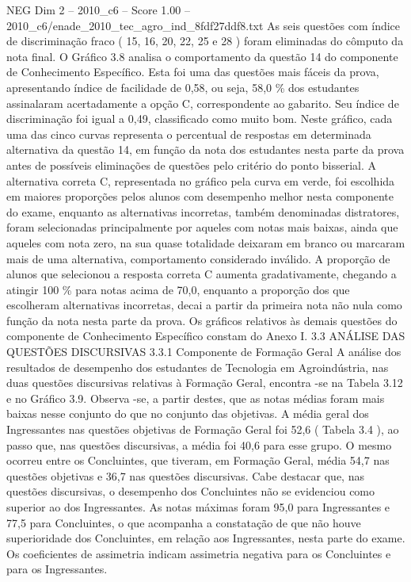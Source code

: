 \begin{textsample}{NEG Dim 2 – 2010\_c6 – Score 1.00 – 2010\_c6/enade\_2010\_tec\_agro\_ind\_8fdf27ddf8.txt}
As seis questões com índice de discriminação fraco ( 15, 16, 20, 22, 25 e 28 ) foram eliminadas do cômputo da nota final.
O Gráfico 3.8 analisa o comportamento da questão 14 do componente de Conhecimento Específico.
Esta foi uma das questões mais fáceis da prova, apresentando índice de facilidade de 0,58, ou seja, 58,0 \% dos estudantes assinalaram acertadamente a opção C, correspondente ao gabarito.
Seu índice de discriminação foi igual a 0,49, classificado como muito bom.
Neste gráfico, cada uma das cinco curvas representa o percentual de respostas em determinada alternativa da questão 14, em função da nota dos estudantes nesta parte da prova antes de possíveis eliminações de questões pelo critério do ponto bisserial.
A alternativa correta C, representada no gráfico pela curva em verde, foi escolhida em maiores proporções pelos alunos com desempenho melhor nesta componente do exame, enquanto as alternativas incorretas, também denominadas distratores, foram selecionadas principalmente por aqueles com notas mais baixas, ainda que aqueles com nota zero, na sua quase totalidade deixaram em branco ou marcaram mais de uma alternativa, comportamento considerado inválido.
A proporção de alunos que selecionou a resposta correta C aumenta gradativamente, chegando a atingir 100 \% para notas acima de 70,0, enquanto a proporção dos que escolheram alternativas incorretas, decai a partir da primeira nota não nula como função da nota nesta parte da prova.
Os gráficos relativos às demais questões do componente de Conhecimento Específico constam do Anexo I. 3.3 ANÁLISE DAS QUESTÕES DISCURSIVAS 3.3.1 Componente de Formação Geral A análise dos resultados de desempenho dos estudantes de Tecnologia em Agroindústria, nas duas questões discursivas relativas à Formação Geral, encontra -se na Tabela 3.12 e no Gráfico 3.9.
Observa -se, a partir destes, que as notas médias foram mais baixas nesse conjunto do que no conjunto das objetivas.
A média geral dos Ingressantes nas questões objetivas de Formação Geral foi 52,6 ( Tabela 3.4 ), ao passo que, nas questões discursivas, a média foi 40,6 para esse grupo.
O mesmo ocorreu entre os Concluintes, que tiveram, em Formação Geral, média 54,7 nas questões objetivas e 36,7 nas questões discursivas.
Cabe destacar que, nas questões discursivas, o desempenho dos Concluintes não se evidenciou como superior ao dos Ingressantes.
As notas máximas foram 95,0 para Ingressantes e 77,5 para Concluintes, o que acompanha a constatação de que não houve superioridade dos Concluintes, em relação aos Ingressantes, nesta parte do exame.
Os coeficientes de assimetria indicam assimetria negativa para os Concluintes e para os Ingressantes.

\end{textsample}
